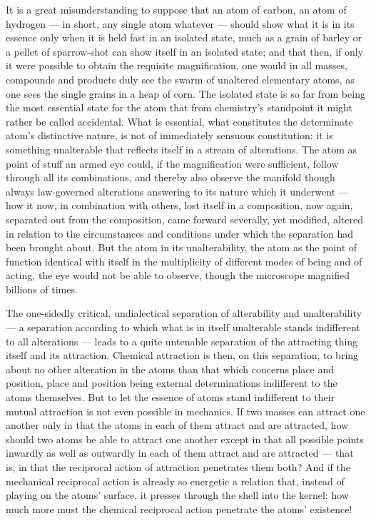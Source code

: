 \documentclass[12pt,a4paper]{book}
\begin{document}
It is a great misunderstanding to suppose that an atom of carbon, an atom of
hydrogen --- in short, any single atom whatever ---
should show what it is in its essence only when it is held fast in an isolated
state, much as a grain of barley or a pellet of sparrow-shot can show itself in
an isolated state; and that then, if only it were possible to obtain the
requisite magnification, one would in all masses, compounds and products duly
see the swarm of unaltered elementary atoms, as one sees the single grains in a
heap of corn. The isolated state is so far from being the most essential state
for the atom that from chemistry's standpoint it might rather be called
accidental. What is essential, what constitutes the determinate atom's
distinctive nature, is not of immediately sensuous constitution: it is
something unalterable that reflects itself in a stream of alterations. The atom
as point of stuff an armed eye could, if the magnification were sufficient,
follow through all its combinations, and thereby also observe the manifold
though always law-governed alterations answering to its nature which it
underwent --- how it now, in combination with others, lost itself in a
composition, now again, separated out from the composition, came forward
severally, yet modified, altered in relation to the circumstances and
conditions under which the separation had been brought about. But the atom in
its unalterability, the atom as the point of function identical with itself in
the multiplicity of different modes of being and of acting, the eye would not
be able to observe, though the microscope magnified billions of times.

The one-sidedly critical, undialectical separation of alterability and
unalterability --- a separation according to which what is in itself
unalterable stands indifferent to all alterations --- leads to a quite
untenable separation of the attracting thing itself and its attraction.
Chemical attraction is then, on this separation, to bring about no other
alteration in the atoms than that which concerns place and position, place and
position being external determinations indifferent to the atoms themselves. But
to let the essence of atoms stand
\setcounter{footnote}{0}
indifferent to their mutual attraction is not even possible in mechanics. If
two masses can attract one another only in that the atoms in each of them
attract and are attracted, how should two atoms be able to attract one another
except in that all possible points inwardly as well as outwardly in each of
them attract and are attracted --- that is, in that the reciprocal action of
attraction penetrates them both? And if the mechanical reciprocal action is
already so energetic a relation that, instead of playing on the atoms' surface,
it presses through the shell into the kernel: how much more must the chemical
reciprocal action penetrate the atoms' existence!
\end{document}
